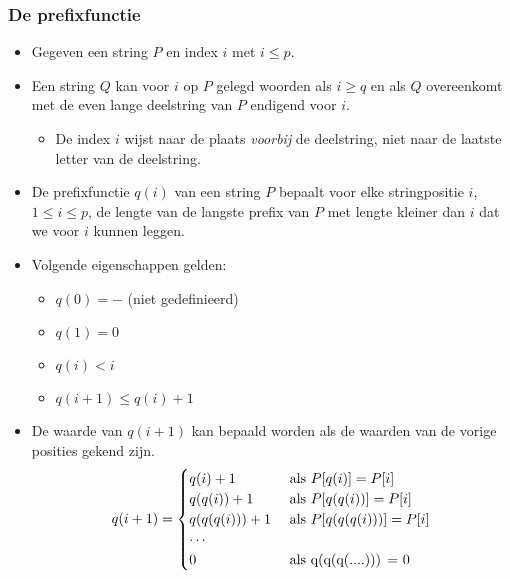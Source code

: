 \subsubsection{De prefixfunctie}
\begin{itemize}
    \item Gegeven een string $P$ en index $i$ met $i \leq p$.
    \item Een string $Q$ kan voor $i$ op $P$ gelegd woorden als $i \geq q$ en als $Q$ overeenkomt met de even lange deelstring van $P$ endigend voor $i$.
    \begin{itemize}
        \item De index $i$ wijst naar de plaats \textit{voorbij} de deelstring, niet naar de laatste letter van de deelstring.
    \end{itemize}
    \item De prefixfunctie $q(i)$ van een string $P$ bepaalt voor elke stringpositie $i$, $1 \leq i \leq p$, de lengte van de langste prefix van $P$ met lengte kleiner dan $i$ dat we voor $i$ kunnen leggen.

    \item Volgende eigenschappen gelden:
    \begin{itemize}
        \item $q(0) = -$ (niet gedefinieerd)
        \item $q(1) = 0$
        \item $q(i) < i$
        \item $q(i + 1) \leq q(i) + 1$
    \end{itemize}
    \item De waarde van $q(i + 1)$ kan bepaald worden als de waarden van de vorige posities gekend zijn.
    $$q(i + 1) = \begin{cases}
        q(i) + 1 & \hbox{ als } P[q(i)] = P[i]  \\
        q(q(i)) + 1 & \hbox{ als } P[q(q(i))] = P[i] \\
        q(q(q(i))) + 1 & \hbox{ als } P[q(q(q(i)))] = P[i] \\
        \cdots \\
        0 & \hbox { als q(q(q(....))) = 0 }
    \end{cases}$$


\end{itemize}
